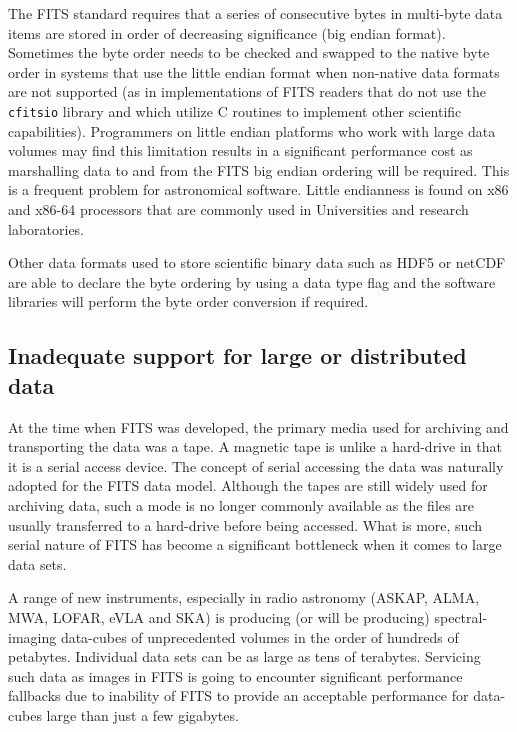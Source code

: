 \documentclass[final,authoryear,5p,times,twocolumn]{elsarticle}
\begin{document}
The FITS standard  \citep{1981A&AS...44..363W} requires that a series of
consecutive bytes in multi-byte data items are stored in order of decreasing
significance (big endian format).  Sometimes the byte order needs to be
checked and swapped to the native byte order in systems that use the little
endian format when non-native data formats are not supported (as in
implementations of FITS readers that do not use the \texttt{cfitsio} library
and which utilize C routines to implement other scientific capabilities).
Programmers on little endian platforms who work with large data volumes may
find this limitation results in a significant performance cost as
marshalling data to and from the FITS big endian ordering will be required.
This is a frequent problem for astronomical software. Little endianness is
found on x86 and x86-64 processors that are commonly used in Universities
and research laboratories.


Other data formats used to store scientific binary data such as HDF5 or
netCDF are able to declare the byte ordering by using a data type flag and
the software libraries will perform the byte order conversion if required.


\subsection{Inadequate support for large or distributed data}

At the time when FITS was developed, the primary media used for
archiving and transporting the data was a tape. A magnetic tape is
unlike a hard-drive in that it is a serial access device.  The concept
of serial accessing the data was naturally adopted for the FITS data
model.  Although the tapes are still widely used for archiving data,
such a mode is no longer commonly available as the files are usually
transferred to a hard-drive before being accessed. What is more, such
serial nature of FITS has become a significant bottleneck when it comes
to large data sets.

A range of new instruments, especially in radio astronomy (ASKAP,
ALMA, MWA, LOFAR, eVLA and SKA) is producing (or will be producing)
spectral-imaging data-cubes of unprecedented volumes in the order of
hundreds of petabytes. Individual data sets can be as large as tens of
terabytes.  Servicing such data as images in FITS is going to encounter
significant performance fallbacks due to inability of FITS to provide
an acceptable performance for data-cubes large than just a few gigabytes.
\end{document}
